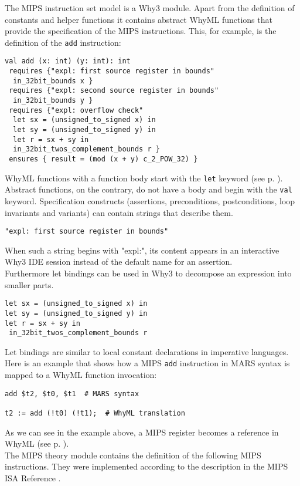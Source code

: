 The MIPS instruction set model is a Why3 module. Apart from the definition of 
constants and helper functions it contains abstract WhyML functions that provide 
the specification of the MIPS instructions. 
This, for example, is the definition of the \verb"add" instruction:
\begin{lstlisting}
val add (x: int) (y: int): int
 requires {"expl: first source register in bounds" 
  in_32bit_bounds x }
 requires {"expl: second source register in bounds"
  in_32bit_bounds y }
 requires {"expl: overflow check" 
  let sx = (unsigned_to_signed x) in
  let sy = (unsigned_to_signed y) in
  let r = sx + sy in
  in_32bit_twos_complement_bounds r }
 ensures { result = (mod (x + y) c_2_POW_32) }
\end{lstlisting}
WhyML functions with a function body start with the \verb"let" keyword (see p. \pageref{function}).
Abstract functions, on the contrary, do not have a body and begin with the 
\verb"val" keyword. Specification constructs (assertions, preconditions, postconditions,
loop invariants and variants) can contain strings that describe them. 
\begin{lstlisting}
"expl: first source register in bounds" 
\end{lstlisting}
When such a string begins with "expl:", its content appears in an interactive Why3 IDE session
instead of the default name for an assertion. \\
Furthermore let bindings can be used in Why3 to decompose an expression into smaller parts. 
\begin{lstlisting}
let sx = (unsigned_to_signed x) in
let sy = (unsigned_to_signed y) in
let r = sx + sy in
 in_32bit_twos_complement_bounds r
\end{lstlisting}
Let bindings are similar to local constant declarations in imperative languages. \\
Here is an example that shows how a MIPS \verb"add" instruction in MARS syntax is mapped to a WhyML function
invocation:
\begin{lstlisting}
add $t2, $t0, $t1  # MARS syntax

t2 := add (!t0) (!t1);  # WhyML translation
\end{lstlisting}
As we can see in the example above, a MIPS register becomes a reference in WhyML (see p. \pageref{ref}). \\
The MIPS theory module contains the definition of the following MIPS instructions. 
They were implemented according to the description in the MIPS ISA Reference \cite{mipsisa}.\\
